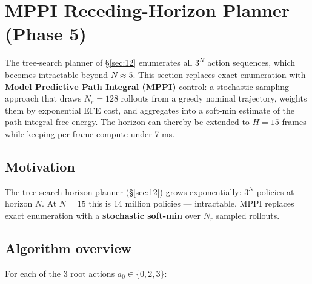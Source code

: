 \documentclass[12pt, a4paper]{article}
\newcommand{\1}{\mathbf{1}}
\begin{document}
\section{MPPI Receding-Horizon Planner (Phase 5)}
\label{sec:15}

The tree-search planner of \S\ref{sec:12} enumerates all $3^N$ action sequences,
which becomes intractable beyond $N \approx 5$.  This section replaces exact
enumeration with \textbf{Model Predictive Path Integral (MPPI)} control: a
stochastic sampling approach that draws $N_r = 128$ rollouts from a greedy
nominal trajectory, weights them by exponential EFE cost, and aggregates into a
soft-min estimate of the path-integral free energy.  The horizon can thereby be
extended to $H = 15$ frames while keeping per-frame compute under 7 ms.

\subsection{Motivation}

The tree-search horizon planner (\S\ref{sec:12}) grows exponentially: $3^N$
policies at horizon $N$.  At $N=15$ this is 14 million policies --- intractable.
MPPI replaces exact enumeration with a \textbf{stochastic soft-min} over $N_r$
sampled rollouts.

\subsection{Algorithm overview}

For each of the 3 root actions $a_0 \in \{0, 2, 3\}$:
\end{document}
